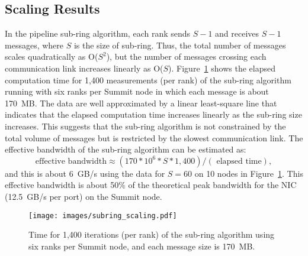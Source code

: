 \subsection{Scaling Results}
% 
In the pipeline sub-ring algorithm, each rank sends $S-1$ and receives
$S-1$ messages, where $S$ is the size of sub-ring. Thus, the total
number of messages scales quadratically as O($S^2$), but the number
of messages crossing each communication link increases linearly as
O($S$).
%
Figure~\ref{fig:subring_scaling} shows the elapsed computation time
for 1,400 measurements (per rank) of the sub-ring algorithm running with six ranks
per Summit node in which each message
is about 170~MB.
%
The data are well approximated by a linear least-square line that
indicates that the elapsed computation time increases linearly as the sub-ring size increases.
%
This suggests that the sub-ring algorithm is not constrained by the total
volume of messages but is restricted by the slowest communication link.
%
The effective bandwidth of the sub-ring algorithm can be estimated as:
\[
\mbox{effective bandwidth} \approx (170*10^6 * S * 1,400)/(\mbox{ elapsed time}),
\]
and this is about 6~GB/s using the data for $S=60$
on 10 nodes
in Figure~\ref{fig:subring_scaling}.
%
This effective bandwidth is about 50\% of the theoretical peak
bandwidth for the NIC (12.5~GB/s per port)
on the Summit node.
%
\begin{figure}[t]
	\centering
	\texttt{[image: images/subring\_scaling.pdf]}
	\caption{Time for 1,400 iterations (per rank) of the sub-ring algorithm using six ranks per Summit node, and 
	         each message size is 170~MB.}
	\label{fig:subring_scaling}
\end{figure}


